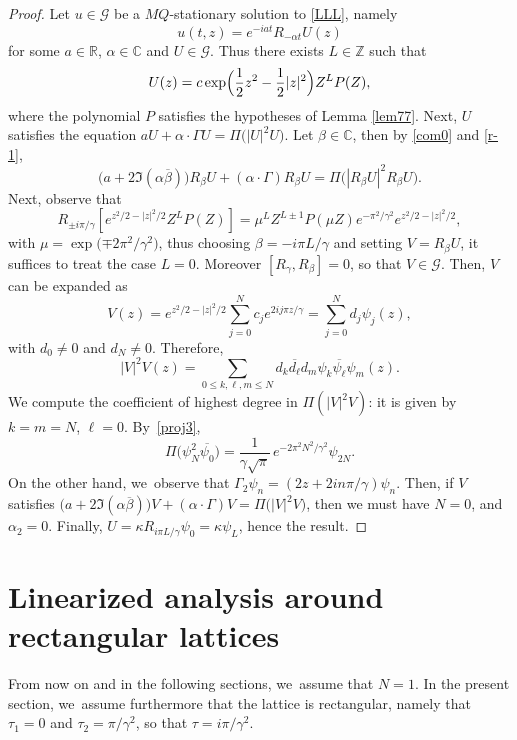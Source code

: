 \documentclass[JEP,XML,SOM,Unicode,NoFloatCountersInSection,published]{cedram}
\theoremstyle{definition}
\let\EE\exp
\let\dis\relax
\let\ov\overline
\newcommand\C{\mathbb C}
\newcommand\R{\mathbb R}
\newcommand\Z{\mathbb Z}
\begin{document}
\begin{proof}
Let $u \in \mathcal{G}$ be a $MQ$-stationary solution to \eqref{LLL}, namely
\[
u(t,z)=e^{-i at}R_{-\alpha t}U(z)
\]
for some $a \in \R$, $\alpha \in \C$ and $U \in \mathcal{G}$. Thus there exists $L \in \Z$ such that
\[
\dis U(z) =c \EE\Bigl({\frac{1}{2} z^2 - \frac{1}{2} |z|^2}\Bigr) Z^L P(Z),
\]
where the polynomial $P$ satisfies the hypotheses of Lemma \ref{lem77}. Next, $U$ satisfies the equation $a U+\alpha \cdot \Gamma U = \Pi \bigl(|U|^2 U\bigr)$. Let $\beta \in \C$, then by \eqref{com0} and \eqref{r-1},
\[
\bigl(a+2 \Im (\alpha \ov{\beta})\bigr) R_\beta U+(\alpha \cdot \Gamma) R_\beta U = \Pi \bigl(|R_\beta U|^2 R_\beta U\bigr).
\]
Next, observe that
\[
R_{\pm {i\pi}/{\gamma}} \left[ e^{ z^2/2 - |z|^2/2} Z^L P(Z) \right] = \mu^L Z^{L\pm 1} P(\mu Z) e^{- {\pi^2}/{\gamma^2}} e^{ z^2/2 - |z|^2/2},
\]
with $\mu = \EE\bigl({\mp {2\pi^2}/{\gamma^2}}\bigr)$, thus choosing $\beta=- {i\pi}L/\gamma$ and setting $V=R_{\beta}U$, it suffices to treat the case $L=0$. Moreover $[R_{\gamma}, R_{\beta}]=0$, so that $V \in \mathcal{G}$. Then, $V$ can be expanded as
\begin{equation*}
V(z)= e^{ z^2/2- |z|^2/2} \sum_{j=0}^Nc_j e^{{2i j \pi z }/{\gamma} }= \sum_{j=0}^Nd_j \psi_j(z),
\end{equation*}
with $d_0 \neq 0$ and $d_N \neq 0$. Therefore,
\begin{equation*}
|V|^2V(z)= \sum_{0 \leq k, \ell, m \leq N}d_{k}\ov{d_{\ell}}d_{m} \psi_{k}\ov{\psi_{\ell}}\psi_{m}(z).
\end{equation*}
We compute the coefficient of highest degree in $\Pi(|V|^2V)$: it is given by $k=m=N$, $\ell=0$. By~\eqref{proj3},
\[
\Pi\bigl(\psi^2_N\ov{\psi_0}\bigr)=\frac{1}{\gamma \sqrt{\pi}}\,e^{-{2\pi^2N^2}/{\gamma^2}}\psi_{2N}.
\]
On the other hand, we~observe that $\Gamma_2 \psi_n=(2z + {2i n\pi}/{\gamma}) \psi_n $. Then, if $V$ satisfies $\bigl(a+2 \Im (\alpha \ov{\beta})\bigr) V +(\alpha \cdot \Gamma) V = \Pi \bigl(|V|^2 V\bigr)$, then we must have $N=0$, and $\alpha_2=0$. Finally, $U=\kappa R_{{i\pi L }/{\gamma }}\psi_0=\kappa \psi_{L}$, hence the result.
\end{proof}

\section{Linearized analysis around rectangular lattices}\label{rectangular_lattice}
\label{section4}

From now on and in the following sections, we~assume that $N=1$. In the present section, we~assume furthermore that the lattice is rectangular, namely that $\tau_1=0$ and $\tau_2={ \pi}/{\gamma^2}$, so that $\tau= { i\pi}/{\gamma^2}$.
\end{document}
